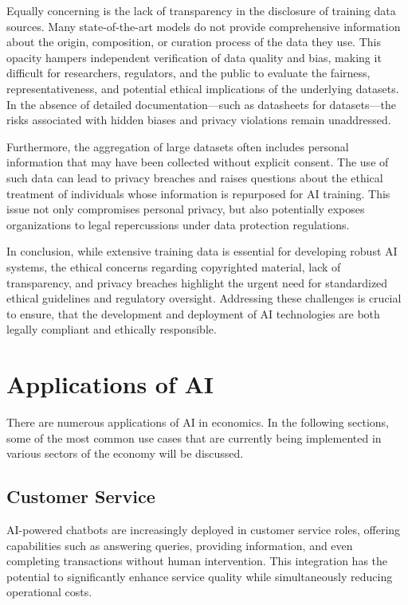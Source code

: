 Equally concerning is the lack of transparency in the disclosure of training data sources. Many state-of-the-art models do not provide comprehensive information about the origin, composition, or curation process of the data they use. This opacity hampers independent verification of data quality and bias, making it difficult for researchers, regulators, and the public to evaluate the fairness, representativeness, and potential ethical implications of the underlying datasets. In the absence of detailed documentation—such as datasheets for datasets—the risks associated with hidden biases and privacy violations remain unaddressed.

Furthermore, the aggregation of large datasets often includes personal information that may have been collected without explicit consent. The use of such data can lead to privacy breaches and raises questions about the ethical treatment of individuals whose information is repurposed for AI training. This issue not only compromises personal privacy, but also potentially exposes organizations to legal repercussions under data protection regulations.

In conclusion, while extensive training data is essential for developing robust AI systems, the ethical concerns regarding copyrighted material, lack of transparency, and privacy breaches highlight the urgent need for standardized ethical guidelines and regulatory oversight. Addressing these challenges is crucial to ensure, that the development and deployment of AI technologies are both legally compliant and ethically responsible.



\section{Applications of AI }
\label{sec:applications-of-ai}

There are numerous applications of AI in economics. In the following sections, some of the most common use cases that are 
currently being implemented in various sectors of the economy will be discussed.

\subsection{Customer Service}
\label{subsec:customer-service}

AI-powered chatbots are increasingly deployed in customer service roles, offering capabilities such as answering queries, providing information, and even completing transactions without human intervention. This integration has the potential to significantly enhance service quality while simultaneously reducing operational costs.  

